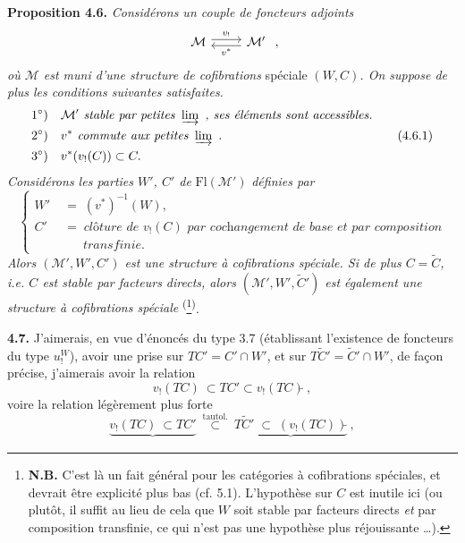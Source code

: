 \documentclass[11pt]{article}
\newcommand{\msp}[1]{\marginpar{\footnotesize [#1]}}
\newcommand{\postilde}{\tilde{}}
\newcommand{\Fl}{\mathrm{Fl}}
\begin{document}
\textbf{Proposition 4.6.} \textit{Considérons un couple de foncteurs adjoints}
\[
\begin{tikzcd}
\mathcal{M} \arrow[r, shift left, "v_!"] & \mathcal{M}' \arrow[l, shift left, "v^*"]
\end{tikzcd}
\ ,
\]
\textit{où $\mathcal{M}$ est muni d'une structure de cofibrations} spéciale $(W, C)$\textit{. On suppose de plus les conditions suivantes satisfaites.}
\[
\begin{aligned}
&1^\circ)\quad \mathcal{M}' \textit{ stable par petites } \varinjlim\ \textit{, ses éléments sont accessibles.} \\
&2^\circ)\quad v^* \textit{ commute aux petites } \varinjlim\ . \\
&3^\circ)\quad v^*(v_!(C)) \subset C.
\end{aligned} \tag*{(4.6.1)}
\]
\msp{page 79}
\textit{Considérons les parties $W'$, $C'$ de} $\Fl(\mathcal{M}')$ \textit{définies par}
\[
\left\{
\begin{aligned}
W' \;&=\; (v^*)^{-1}(W), \\
C' \;&=\; \textit{clôture de } v_!(C) \textit{ par cochangement de base et par composition} \\
&\phantom{\;=\;}\ \textit{transfinie.}
\end{aligned}
\right. \tag*{(4.6.2)}
\]
\textit{Alors $(\mathcal{M}', W', C')$ est une structure à cofibrations spéciale. Si de plus $C = \tilde{C}$, i.e. $C$ est stable par facteurs directs, alors $(\mathcal{M}', W', \tilde{C}')$ est également une structure à cofibrations spéciale} \textsuperscript{(}\footnote[20]{\textbf{N.B.} C'est là un fait général pour les catégories à cofibrations spéciales, et devrait être explicité plus bas (cf. 5.1). L'hypothèse sur $C$ est inutile ici (ou plutôt, il suffit au lieu de cela que $W$ soit stable par facteurs directs \textit{et} par composition transfinie, ce qui n'est pas une hypothèse plus réjouissante \dots).}\textsuperscript{)}.

\textbf{4.7.} J'aimerais, en vue d'énoncés du type 3.7 (établissant l'existence de foncteurs du type $u_!^W$), avoir une prise sur $TC' = C'{\cap}W'$, et sur $T\tilde{C}' = \tilde{C}'{\cap}W'$, de façon précise, j'aimerais avoir la relation
\[
v_!(TC)\ \subset TC' \subset v_!(TC)\postilde\ , \tag*{(4.7.1)}
\]
voire la relation légèrement plus forte
\[
\underbrace{v_!(TC)\ \subset TC'}_{} \ \overset{\text{tautol.}}{\subset}\ \underbrace{T\tilde{C}' \;\subset\; (v_!(TC))\postilde}_{}\ , \tag*{(4.7.2)}
\]
\end{document}
